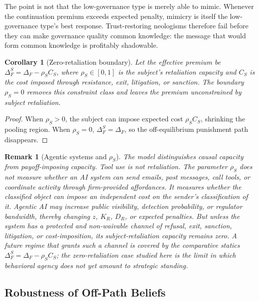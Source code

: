 \documentclass[preprint,authoryear]{elsarticle}
\newtheorem{corollary}{Corollary}
\newtheorem{remark}{Remark}
\theoremstyle{definition}
\theoremstyle{plain}
\begin{document}
The point is not that the low-governance type is merely able to mimic.  Whenever the continuation premium exceeds expected penalty, mimicry is itself the low-governance type's best response.  Trust-restoring neologisms therefore fail before they can make governance quality common knowledge: the message that would form common knowledge is profitably shadowable.

\begin{corollary}[Zero-retaliation boundary]
\label{cor:retaliation-boundary}
\label{thm:comparative}
Let the effective premium be $\Delta_F^S = \Delta_F - \rho_S C_S$, where $\rho_S \in [0,1]$ is the subject's retaliation capacity and $C_S$ is the cost imposed through resistance, exit, litigation, or sanction.  The boundary $\rho_S=0$ removes this constraint class and leaves the premium unconstrained by subject retaliation.
\end{corollary}
\begin{proof}
When $\rho_S>0$, the subject can impose expected cost $\rho_SC_S$, shrinking the pooling region.  When $\rho_S=0$, $\Delta_F^S=\Delta_F$, so the off-equilibrium punishment path disappears.
\end{proof}

\begin{remark}[Agentic systems and $\rho_S$]
The model distinguishes causal capacity from payoff-imposing capacity. Tool use is not retaliation. The parameter $\rho_S$ does not measure whether an AI system can send emails, post messages, call tools, or coordinate activity through firm-provided affordances. It measures whether the classified object can impose an independent cost on the sender's classification of it. Agentic AI may increase public visibility, detection probability, or regulator bandwidth, thereby changing $z$, $K_R$, $D_R$, or expected penalties. But unless the system has a protected and non-waivable channel of refusal, exit, sanction, litigation, or cost-imposition, its subject-retaliation capacity remains zero. A future regime that grants such a channel is covered by the comparative statics $\Delta_F^S=\Delta_F-\rho_S C_S$; the zero-retaliation case studied here is the limit in which behavioral agency does not yet amount to strategic standing.
\end{remark}

\subsection{Robustness of Off-Path Beliefs}
\label{subsec:robustness}
\end{document}
